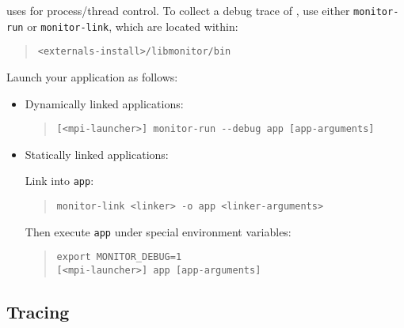 \documentclass[11pt,letterpaper]{report}
\begin{document}
\hpcrun{} uses \libmonitor{} for process/thread control.
To collect a debug trace of \libmonitor{}, use either \texttt{monitor-run} or \texttt{monitor-link}, which are located within:
%
\begin{quote}
  \verb|<externals-install>/libmonitor/bin|
\end{quote}
Launch your application as follows:
%
\begin{itemize}

\item Dynamically linked applications:\hfill
\begin{quote}
  \verb|[<mpi-launcher>] monitor-run --debug app [app-arguments]|
\end{quote}

\item Statically linked applications:\hfill

Link \libmonitor{} into \texttt{app}:
\begin{quote}
  \verb|monitor-link <linker> -o app <linker-arguments>|
\end{quote}
%
Then execute \texttt{app} under special environment variables:
\begin{quote}
\begin{verbatim}
export MONITOR_DEBUG=1
[<mpi-launcher>] app [app-arguments]
\end{verbatim}
\end{quote}
\end{itemize}



\subsection{Tracing \hpcrun{}}
\end{document}
